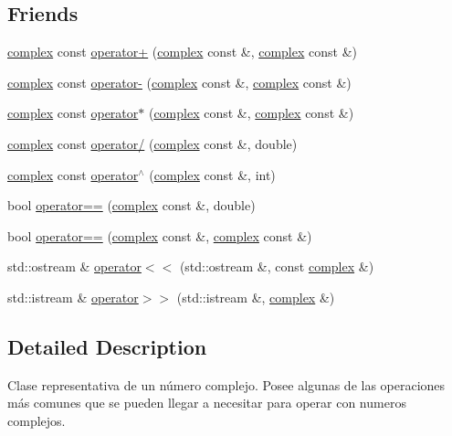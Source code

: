 \subsection*{Friends}
\begin{DoxyCompactItemize}
\item 
\hyperlink{classcomplex}{complex} const \hyperlink{classcomplex_a51e6fff8af1d57796c33097a10c7b649}{operator+} (\hyperlink{classcomplex}{complex} const \&, \hyperlink{classcomplex}{complex} const \&)
\item 
\hyperlink{classcomplex}{complex} const \hyperlink{classcomplex_ae2cd6ca63180f793fa08d6c73d3573ac}{operator-\/} (\hyperlink{classcomplex}{complex} const \&, \hyperlink{classcomplex}{complex} const \&)
\item 
\hyperlink{classcomplex}{complex} const \hyperlink{classcomplex_aae9b43eee24b4245355b38d3996f7179}{operator$\ast$} (\hyperlink{classcomplex}{complex} const \&, \hyperlink{classcomplex}{complex} const \&)
\item 
\hyperlink{classcomplex}{complex} const \hyperlink{classcomplex_a805777316029c2aafa319d5b02dbca99}{operator/} (\hyperlink{classcomplex}{complex} const \&, double)
\item 
\hyperlink{classcomplex}{complex} const \hyperlink{classcomplex_a0c259db70c17e1b38ca2b2fc48ad3bba}{operator$^\wedge$} (\hyperlink{classcomplex}{complex} const \&, int)
\item 
bool \hyperlink{classcomplex_ae168b98543708346ed78b85b14c88d4e}{operator==} (\hyperlink{classcomplex}{complex} const \&, double)
\item 
bool \hyperlink{classcomplex_ad6298ff590939eed6f471575b0ee279e}{operator==} (\hyperlink{classcomplex}{complex} const \&, \hyperlink{classcomplex}{complex} const \&)
\item 
std\-::ostream \& \hyperlink{classcomplex_a92366b815f4b8a37d390851336c6ccbc}{operator$<$$<$} (std\-::ostream \&, const \hyperlink{classcomplex}{complex} \&)
\item 
std\-::istream \& \hyperlink{classcomplex_abc560c7de7f30da959209b234c07ee26}{operator$>$$>$} (std\-::istream \&, \hyperlink{classcomplex}{complex} \&)
\end{DoxyCompactItemize}


\subsection{Detailed Description}
Clase representativa de un número complejo. Posee algunas de las operaciones más comunes que se pueden llegar a necesitar para operar con numeros complejos. 


